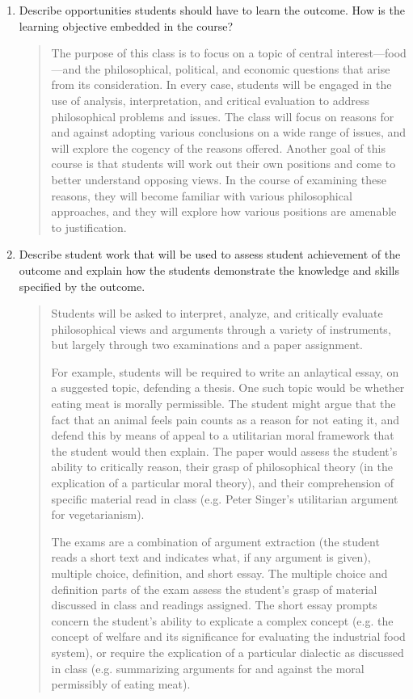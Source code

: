 \documentclass[11pt]{article}
\begin{document}
\begin{enumerate}
\item Describe opportunities students should have to learn the outcome. How is the learning objective embedded in the course?

\begin{quote}
The purpose of this class is to focus on a topic of central
interest---food---and the philosophical, political, and economic questions
that arise from its consideration. In every case, students will be engaged
in the use of analysis, interpretation, and critical evaluation to address
philosophical problems and issues. The class will focus on reasons for and
against adopting various conclusions on a wide range of issues, and will
explore the cogency of the reasons offered. Another goal of this course is
that students will work out their own positions and come to better
understand opposing views. In the course of examining these reasons, they
will become familiar with various philosophical approaches, and they will
explore how various positions are amenable to justification.
\end{quote}

\item Describe student work that will be used to assess student achievement of the outcome and explain how the students demonstrate the knowledge and skills specified by the outcome.

\begin{quote}
  Students will be asked to interpret, analyze, and critically evaluate
  philosophical views and arguments through a variety of instruments, but
  largely through two examinations and a paper assignment.

  For example, students will be required to write an anlaytical essay, on a
  suggested topic, defending a thesis. One such topic would be whether eating
  meat is morally permissible. The student might argue that the fact that an
  animal feels pain counts as a reason for not eating it, and defend this by
  means of appeal to a utilitarian moral framework that the student would then
  explain. The paper would assess the student's ability to critically reason,
  their grasp of philosophical theory (in the explication of a particular moral
  theory), and their comprehension of specific material read in class (e.g.
  Peter Singer's utilitarian argument for vegetarianism).

  The exams are a combination of argument extraction (the student reads a short
  text and indicates what, if any argument is given), multiple choice,
  definition, and short essay. The multiple choice and definition parts of the
  exam assess the student's grasp of material discussed in class and readings
  assigned. The short essay prompts concern the student's ability to explicate a
  complex concept (e.g. the concept of welfare and its significance for
  evaluating the industrial food system), or require the explication of a
  particular dialectic as discussed in class (e.g. summarizing arguments for and
  against the moral permissibly of eating meat).
\end{quote}


\end{enumerate}
\end{document}
